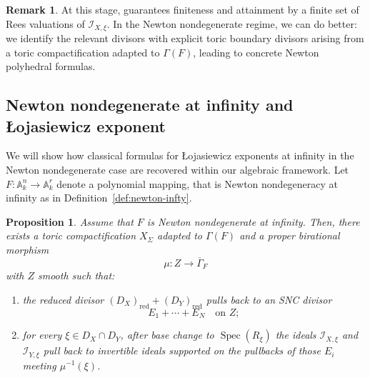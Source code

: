 \documentclass[12pt]{amsart}
\newcommand{\kk}{k}
\renewcommand{\AA}{\mathbb{A}}
\DeclareMathOperator{\Spec}{Spec}
\theoremstyle{plain}
\newtheorem{proposition}[theorem]{Proposition}
\theoremstyle{definition}
\newtheorem{remark}[theorem]{Remark}
\numberwithin{equation}{section}
\begin{document}
\begin{remark}\label{rem:meta-infty-to-toric}
	At this stage,  guarantees finiteness and attainment by a finite set of
	Rees valuations of $\mathscr I_{X,\xi}$. In the Newton nondegenerate regime,
	we can do better: we identify the relevant divisors with explicit toric boundary divisors arising
	from a toric compactification adapted to $\Gamma(F)$, leading to concrete Newton polyhedral
	formulas.
\end{remark}


\subsection{Newton nondegenerate at infinity and \L{}ojasiewicz exponent}\label{subsec:newton-recovery}

We will show how classical formulas for \L{}ojasiewicz exponents at infinity in the Newton nondegenerate case are recovered within our algebraic framework. Let $F:\AA^n_\kk\to\AA^r_\kk$ denote a polynomial mapping, that is Newton nondegeneracy at infinity as in Definition~\ref{def:newton-infty}.

\begin{proposition}\label{prop:toric-control-at-infty}
	Assume that $F$ is Newton nondegenerate at infinity. Then, there exists a toric compactification
	$X_\Sigma$ adapted to $\Gamma(F)$ and a proper birational morphism
	\[
	\mu:Z \longrightarrow \overline{\Gamma}_F
	\]
	with $Z$ smooth such that:
	\begin{enumerate}
		\item the reduced divisor $(D_X)_\text{red}+(D_Y)_\text{red}$ pulls back to an SNC divisor
		\[
		E_1+\cdots+E_N
		\quad\text{on } Z;
		\]
		\item for every $\xi\in D_X\cap D_Y$, after base change to $\Spec(R_\xi)$ the ideals
		$\mathscr I_{X,\xi}$ and $\mathscr I_{Y,\xi}$ pull back to invertible ideals supported on the
		pullbacks of those $E_i$ meeting $\mu^{-1}(\xi)$.
	\end{enumerate}
\end{proposition}
\end{document}
